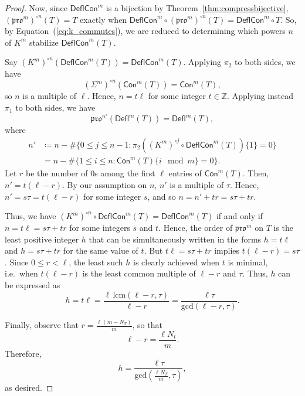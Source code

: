 \documentclass[12pt]{amsart}
\theoremstyle{definition}
\theoremstyle{remark}
\numberwithin{equation}{section}
\newcommand{\pro}{\mathfrak{pro}}
\newcommand{\deflate}{\ensuremath{\mathsf{Defl}}}
\newcommand{\content}{\ensuremath{\mathsf{Con}}}
\newcommand{\compress}{\ensuremath{\mathsf{DeflCon}}}
\begin{document}
\begin{proof}
Now, since $\compress^m$ is a bijection by Theorem~\ref{thm:compressbijective}, $(\pro^m)^{\circ n}(T) = T$ exactly when $\compress^m \circ (\pro^m)^{\circ n}(T) = \compress^m \circ T$. So, by Equation~(\ref{eq:k_commutes}), we are reduced to determining which powers $n$ of $K^m$ stabilize $\compress^m(T)$.
 

 
Say $(K^m)^{\circ n}(\compress^m(T)) = \compress^m(T)$. Applying $\pi_2$ to both sides, we have \[ (\Sigma^m)^{\circ n}(\content^m(T)) = \content^m(T), \] so $n$ is a multiple of $\ell$. Hence, $n = t \ell$ for some integer $t \in \mathbb{Z}$.  Applying instead $\pi_1$ to both sides, we have \[ \pro^{n'}(\deflate^m(T)) = \deflate^m(T), \] where 
\begin{align*}
n' &\coloneqq n - \# \{ 0 \leq j \leq n-1 : \pi_2 ((K^m)^{\circ j} \circ \compress^m(T)) \lbrace 1 \rbrace = 0\} \\
&= n - \#  \{ 1 \leq i \leq n : \content^m(T) \lbrace i \mod m \rbrace = 0\}.
\end{align*}
Let $r$ be the number of $0$s among the first $\ell$ entries of $\content^m(T)$. Then, $n' = t(\ell - r)$. By our assumption on $n$, $n'$ is a multiple of $\tau$. Hence, $n' = s \tau = t(\ell - r)$ for some integer $s$, and so $n = n' + tr = s\tau + tr$.

Thus, we have $(K^m)^{\circ n}  \circ \compress^m(T) = \compress^m(T)$ if and only if $n = t \ell = s \tau + t  r$ for some integers $s$ and $t$. Hence, the order of $\pro^m$ on $T$ is the least positive integer $h$ that can be simultaneously written in the forms $h = t \ell$ and $h=s \tau + t r$ for the same value of $t$. But $t \ell = s\tau + tr$ implies $t(\ell-r) = s\tau$. Since $0 \leq r < \ell$, the least such $h$ is clearly achieved when $t$ is minimal, i.e.\ when $t(\ell-r)$ is the least common multiple of $\ell-r$ and $\tau$. Thus, $h$ can be expressed as 
\begin{equation}\label{eq:period}
h = t \ell = \frac{\ell \, \text{lcm}(\ell-r,\tau)}{\ell-r} = \frac{\ell \tau}{\text{gcd}(\ell-r,\tau)}.
\end{equation}

Finally, observe that $r = \frac{\ell (m-N_T)}{m}$, so that \[ \ell - r = \frac{\ell N_t}{m}.\]
Therefore,
\[ h = \frac{\ell \tau}{\text{gcd}(\frac{\ell N_T}{m},\tau)}, \]
as desired. 
\end{proof}
\end{document}
